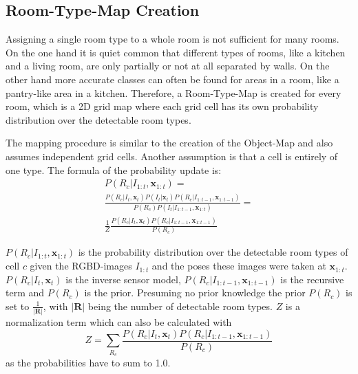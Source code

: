 \subsection{Room-Type-Map Creation} \label{Room-Type-Map}

Assigning a single room type to a whole room is not sufficient for many rooms. On the one hand it is quiet common that different types of rooms, like a kitchen and a living room, are only partially or not at all separated by walls. On the other hand more accurate classes can often be found for areas in a room, like a pantry-like area in a kitchen. Therefore, a Room-Type-Map is created for every room, which is a 2D grid map where each grid cell has its own probability distribution over the detectable room types. 

The mapping procedure is similar to the creation of the  Object-Map and also assumes independent grid cells. Another assumption is that a cell is entirely of one type. The formula of the probability update is: 
\begin{multline}
 P(R_{c}|I_{1:t}, \mathbf{x}_{1:t}) = 
 \\ \frac{P(R_{c}|I_{t}, \mathbf{x}_{t})P(I_{t}| \mathbf{x}_{t})P(R_{c}|I_{1:t-1}, \mathbf{x}_{1:t-1})}
 {P(R_{c})P(I_{t}|I_{1:t-1}, \mathbf{x}_{1:t})} 
 = \\ \frac{1}{Z} \frac{P(R_{c}|I_{t}, \mathbf{x}_{t})P(R_{c}|I_{1:t-1}, \mathbf{x}_{1:t-1})}{P(R_{c})}
\end{multline}

$P(R_{c}|I_{1:t}, \mathbf{x}_{1:t})$ is the probability distribution over the detectable room types of cell $c$ given the RGBD-images $I_{1:t}$ and the poses these images were taken at $\mathbf{x}_{1:t}$. $P(R_{c}|I_{t}, \mathbf{x}_{t})$ is the inverse sensor model, $P(R_{c}|I_{1:t-1}, \mathbf{x}_{1:t-1})$ is the recursive term and $P(R_{c})$ is the prior. Presuming no prior knowledge the prior $P(R_{c})$ is set to $\frac{1}{|\mathbf{R}|}$, with $|\mathbf{R}|$ being the number of detectable room types. $Z$ is a normalization term which can also be calculated with 
\begin{equation}
 Z=\sum_{R_c} \frac{P(R_{c}|I_{t}, \mathbf{x}_{t})P(R_{c}|I_{1:t-1}, \mathbf{x}_{1:t-1})}{P(R_{c})}
\end{equation}
as the probabilities have to sum to 1.0. 


